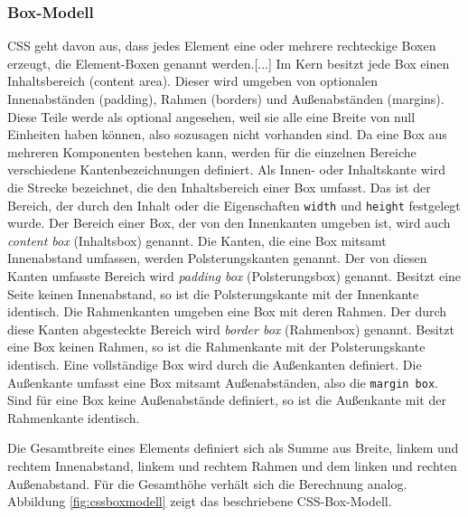 \subsubsection{Box-Modell} \glqq CSS geht davon aus, dass jedes Element eine oder mehrere rechteckige Boxen erzeugt, die Element-Boxen genannt werden.[...] Im Kern besitzt jede Box einen Inhaltsbereich (content area). Dieser wird umgeben von optionalen Innenabständen (padding), Rahmen (borders) und Außenabständen (margins). Diese Teile werde als optional angesehen, weil sie alle eine Breite von null Einheiten haben können, also sozusagen nicht vorhanden sind.\grqq{}\cite[S.167]{MeyeCasc2005} \glqq Da eine Box aus mehreren Komponenten bestehen kann, werden für die einzelnen Bereiche verschiedene Kantenbezeichnungen definiert. Als Innen- oder Inhaltskante wird die Strecke bezeichnet, die den Inhaltsbereich einer Box umfasst. Das ist der Bereich, der durch den Inhalt oder die Eigenschaften \texttt{width} und \texttt{height} festgelegt wurde. Der Bereich einer Box, der von den Innenkanten umgeben ist, wird auch \textit{content box} (Inhaltsbox) genannt. Die Kanten, die eine Box mitsamt Innenabstand umfassen, werden Polsterungskanten genannt. Der von diesen Kanten umfasste Bereich wird \textit{padding box} (Polsterungsbox) genannt. Besitzt eine Seite keinen Innenabstand, so ist die Polsterungskante mit der Innenkante identisch. Die Rahmenkanten umgeben eine Box mit deren Rahmen. Der durch diese Kanten abgesteckte Bereich wird \textit{border box} (Rahmenbox) genannt. Besitzt eine Box keinen Rahmen, so ist die Rahmenkante mit der Polsterungskante identisch. Eine vollständige Box wird durch die Außenkanten definiert. Die Außenkante umfasst eine Box mitsamt Außenabständen, also die \texttt{margin box}. Sind für eine Box keine Außenabstände definiert, so ist die Außenkante mit der Rahmenkante identisch.\grqq{}\cite{SelfHtml20145}\par Die Gesamtbreite eines Elements definiert sich als Summe aus Breite, linkem und rechtem Innenabstand, linkem und rechtem Rahmen und dem linken und rechten Außenabstand. Für die Gesamthöhe verhält sich die Berechnung analog. Abbildung \ref{fig:cssboxmodell} zeigt das beschriebene CSS-Box-Modell.

